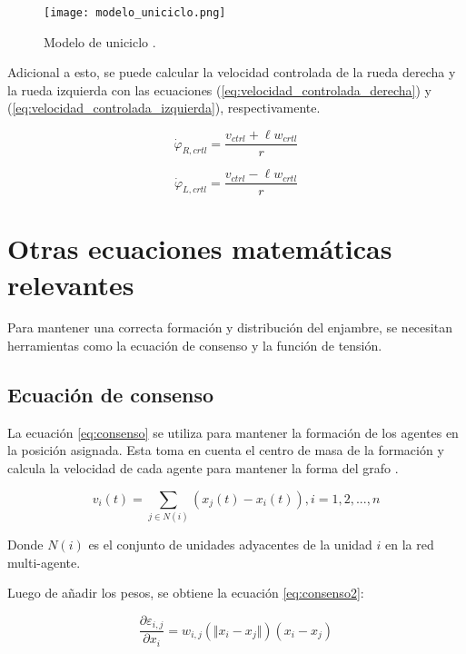 \begin{figure}[H]
	\centering
	\texttt{[image: modelo\_uniciclo.png]}
	\caption{Modelo de uniciclo \cite{ZeaM_modelo_uniciclo}.}
	\label{fig:modelo_uniciclo}
\end{figure}

Adicional a esto, se puede calcular la velocidad controlada de la rueda derecha y la rueda izquierda con las ecuaciones (\ref{eq:velocidad_controlada_derecha}) y (\ref{eq:velocidad_controlada_izquierda}), respectivamente.

\begin{equation}
	\dot{\varphi}_{R,crtl} = \frac{v_{ctrl} + \ell w_{crtl}}{r}
	\label{eq:velocidad_controlada_derecha}
\end{equation}

\begin{equation}
	\dot{\varphi}_{L,crtl} = \frac{v_{ctrl} - \ell w_{crtl}}{r}
	\label{eq:velocidad_controlada_izquierda}
\end{equation}

\section{Otras ecuaciones matemáticas relevantes}
Para mantener una correcta formación y distribución del enjambre, se necesitan herramientas como la ecuación de consenso y la función de tensión.

\subsection{Ecuación de consenso}
La ecuación \ref{eq:consenso} se utiliza para mantener la formación de los agentes en la posición asignada. Esta toma en cuenta el centro de masa de la formación y calcula la velocidad de cada agente para mantener la forma del grafo \cite{PenaAM_2019_tesis}.

\begin{equation}
	v_i(t) = \sum_{j \in N(i)} (x_j(t) - x_i(t)), i = 1, 2, ..., n
	\label{eq:consenso}
\end{equation}

Donde $N(i)$ es el conjunto de unidades adyacentes de la unidad $i$ en la red multi-agente.

Luego de añadir los pesos, se obtiene la ecuación \ref{eq:consenso2}:

\begin{equation}
	\frac{\partial \varepsilon_{i,j}}{\partial x_i} = w_{i,j}(\Vert x_i - x_j \Vert)(x_i - x_j)
	\label{eq:consenso2}
\end{equation}

